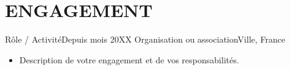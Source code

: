 \section{ENGAGEMENT}
\resumeSubHeadingListStart

\resumeSubheading
  {Rôle / Activité}{Depuis mois 20XX}
  {Organisation ou association}{Ville, France}
  \begin{itemize}[leftmargin=0.12in, label={}, itemsep=0pt]
    \item \small Description de votre engagement et de vos responsabilités.
  \end{itemize}

\resumeSubHeadingListEnd
